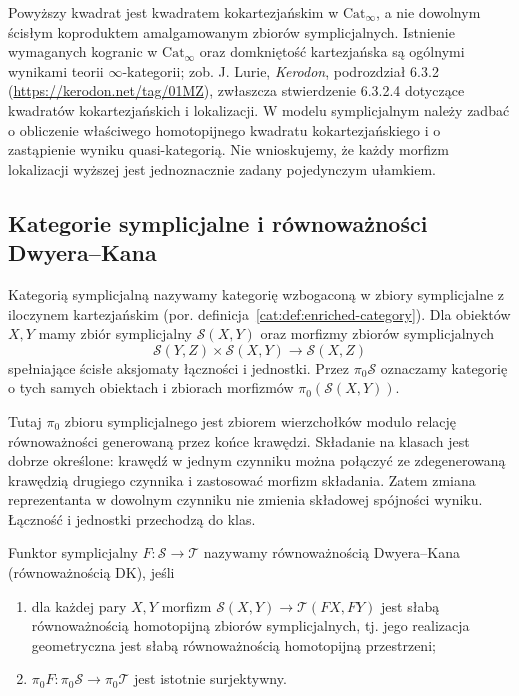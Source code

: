 \begin{uwaga}\label{cat:rem:infty-localization-pushout}
Powyższy kwadrat jest kwadratem kokartezjańskim w $\mathrm{Cat}_\infty$, a nie dowolnym ścisłym koproduktem amalgamowanym zbiorów symplicjalnych. Istnienie wymaganych kogranic w $\mathrm{Cat}_\infty$ oraz domkniętość kartezjańska są ogólnymi wynikami teorii $\infty$-kategorii; zob. J. Lurie, \emph{Kerodon}, podrozdział 6.3.2 (\url{https://kerodon.net/tag/01MZ}), zwłaszcza stwierdzenie 6.3.2.4 dotyczące kwadratów kokartezjańskich i lokalizacji. W modelu symplicjalnym należy zadbać o obliczenie właściwego homotopijnego kwadratu kokartezjańskiego i o zastąpienie wyniku quasi-kategorią. Nie wnioskujemy, że każdy morfizm lokalizacji wyższej jest jednoznacznie zadany pojedynczym ułamkiem.
\end{uwaga}

\subsection{Kategorie symplicjalne i równoważności Dwyera--Kana}

\begin{definicja}\label{cat:def:dk-simplicial-category}
Kategorią symplicjalną nazywamy kategorię wzbogaconą w zbiory symplicjalne z iloczynem kartezjańskim (por. definicja~\ref{cat:def:enriched-category}). Dla obiektów $X,Y$ mamy zbiór symplicjalny $\mathcal S(X,Y)$ oraz morfizmy zbiorów symplicjalnych
\[
 \mathcal S(Y,Z)\times\mathcal S(X,Y)\longrightarrow\mathcal S(X,Z)
\]
spełniające ścisłe aksjomaty łączności i jednostki. Przez $\pi_0\mathcal S$ oznaczamy kategorię o tych samych obiektach i zbiorach morfizmów $\pi_0(\mathcal S(X,Y))$.
\end{definicja}

Tutaj $\pi_0$ zbioru symplicjalnego jest zbiorem wierzchołków modulo relację równoważności generowaną przez końce krawędzi. Składanie na klasach jest dobrze określone: krawędź w jednym czynniku można połączyć ze zdegenerowaną krawędzią drugiego czynnika i zastosować morfizm składania. Zatem zmiana reprezentanta w dowolnym czynniku nie zmienia składowej spójności wyniku. Łączność i jednostki przechodzą do klas.

\begin{definicja}\label{cat:def:dk-equivalence}
Funktor symplicjalny $F:\mathcal S\to\mathcal T$ nazywamy równoważnością Dwyera--Kana (równoważnością DK), jeśli
\begin{enumerate}
 \item dla każdej pary $X,Y$ morfizm $\mathcal S(X,Y)\to\mathcal T(FX,FY)$ jest słabą równoważnością homotopijną zbiorów symplicjalnych, tj. jego realizacja geometryczna jest słabą równoważnością homotopijną przestrzeni;
 \item $\pi_0F:\pi_0\mathcal S\to\pi_0\mathcal T$ jest istotnie surjektywny.
\end{enumerate}
\end{definicja}

